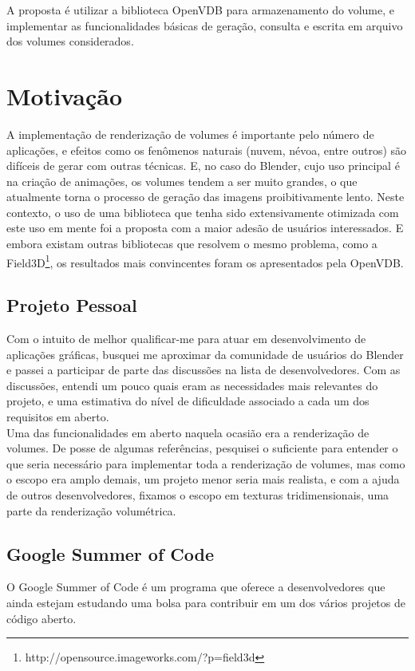 A proposta é utilizar a biblioteca OpenVDB para armazenamento do volume, e implementar as funcionalidades básicas de geração, consulta e escrita em arquivo dos volumes considerados.

\section{Motivação}

A implementação de renderização de volumes é importante pelo número de aplicações, e efeitos como os fenômenos naturais (nuvem, névoa, entre outros) são difíceis de gerar com outras técnicas. E, no caso do Blender, cujo uso principal é na criação de animações, os volumes tendem a ser muito grandes, o que atualmente torna o processo de geração das imagens proibitivamente lento. Neste contexto, o uso de uma biblioteca que tenha sido extensivamente otimizada com este uso em mente foi a proposta com a maior adesão de usuários interessados. E embora existam outras bibliotecas que resolvem o mesmo problema, como a Field3D\footnote{http://opensource.imageworks.com/?p=field3d}, os resultados mais convincentes foram os apresentados pela OpenVDB.


\subsection*{Projeto Pessoal}
Com o intuito de melhor qualificar-me para atuar em desenvolvimento de aplicações gráficas, busquei me aproximar da comunidade de usuários do Blender e passei a participar de parte das discussões na lista de desenvolvedores. Com as discussões, entendi um pouco quais eram as necessidades mais relevantes do projeto, e uma estimativa do nível de dificuldade associado a cada um dos requisitos em aberto. \\

Uma das funcionalidades em aberto naquela ocasião era a renderização de volumes. De posse de algumas referências, pesquisei o suficiente para entender o que seria necessário para implementar toda a renderização de volumes, mas como o escopo era amplo demais, um projeto menor seria mais realista, e com a ajuda de outros desenvolvedores, fixamos o escopo em texturas tridimensionais, uma parte da renderização volumétrica. 

\subsection*{Google Summer of Code}
O Google Summer of Code é um programa que oferece a desenvolvedores que ainda estejam estudando uma bolsa para contribuir em um dos vários projetos de código aberto. \\

